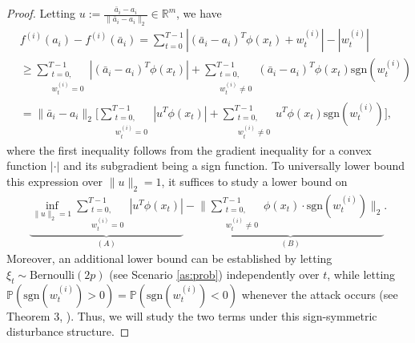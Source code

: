 \documentclass[letterpaper,10pt,conference]{ieeeconf}
\theoremstyle{plain} %
\theoremstyle{plain} %
\theoremstyle{plain} %
\theoremstyle{plain}
\begin{document}
\begin{proof}
  Letting $u:= \frac{\bar a_i - a_i}{\|\bar a_i - a_i\|_2}\in\mathbb{R}^m$,  we have 
   \begin{align*}
      & f^{(i)}(a_i) - f^{(i)}(\bar a_i) = \sum_{t=0}^{T-1} |(\bar a_i-a_i)^T \phi(x_t) + w_t^{(i)}| -  |w_t^{(i)}|\\&\ge\sum_{\substack{t=0,\\ w_t^{(i)}=0}}^{T-1} |(\bar a_i-a_i)^T \phi(x_t) | + \sum_{\substack{t=0,\\ w_t^{(i)}\ne0}}^{T-1} (\bar a_i-a_i)^T \phi(x_t) \mathrm{sgn}(w_t^{(i)})\\&= \|\bar a_i-a_i\|_2 \biggr[\sum_{\substack{t=0,\\ w_t^{(i)}=0}}^{T-1} |u^T \phi(x_t) | + \sum_{\substack{t=0,\\ w_t^{(i)}\ne0}}^{T-1} u^T \phi(x_t)  \mathrm{sgn}(w_t^{(i)})\biggr],
   \end{align*}
where the first inequality follows from the gradient inequality for a convex function $|\cdot |$   and its subgradient being a sign function. To universally lower bound this expression over $\|u\|_2= 1$, it suffices to study a lower bound on 
\begin{align*}
   \underbrace{ \inf_{\|u\|_2 = 1} \sum_{\substack{t=0,\\ w_t^{(i)}=0}}^{T-1} |u^T \phi(x_t) |}_{(A)}  - \underbrace{\Biggr\|\sum_{\substack{t=0,\\ w_t^{(i)}\ne0}}^{T-1} \phi(x_t) \cdot \mathrm{sgn}(w_t^{(i)})\Biggr\|_2}_{(B)}.
\end{align*}
Moreover, an additional lower bound can be established by letting $\xi_t\sim \mathrm{Bernoulli}(2p)$ (see Scenario \ref{as:prob}) independently over $t$, while letting $\mathbb{P}(\mathrm{sgn}(w_t^{(i)})>0)=\mathbb{P}(\mathrm{sgn}(w_t^{(i)})<0)$ whenever the attack occurs (see Theorem 3, \cite{kim2024prevailing}). Thus, we will study the two terms under this sign-symmetric disturbance structure.


\end{proof}
\end{document}

